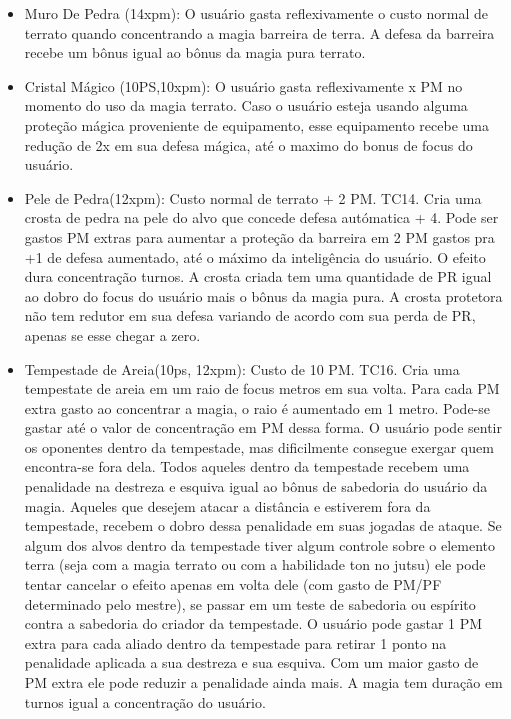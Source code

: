 \begin{itemize}
\item Muro De Pedra (14xpm): O usuário gasta reflexivamente o custo normal de terrato quando concentrando a magia barreira de terra. A defesa da barreira recebe um bônus igual ao bônus da magia pura terrato.

\item Cristal Mágico (10PS,10xpm): O usuário gasta reflexivamente x PM no momento do uso da magia terrato. Caso o usuário esteja usando alguma proteção mágica proveniente de equipamento, esse equipamento recebe uma redução de 2x em sua defesa mágica, até o maximo do bonus de focus do usuário. 

\item Pele de Pedra(12xpm): Custo normal de terrato + 2 PM. TC14.\newline
Cria uma crosta de pedra na pele do alvo que concede defesa autómatica + 4. Pode ser gastos PM extras para aumentar a proteção da barreira em 2 PM gastos pra +1 de defesa aumentado, até o máximo da inteligência do usuário. O efeito dura concentração turnos. A crosta criada tem uma quantidade de PR igual ao dobro do focus do usuário mais o bônus da magia pura. A crosta protetora não tem redutor em sua defesa variando de acordo com sua perda de PR, apenas se esse chegar a zero. 

\item Tempestade de Areia(10ps, 12xpm): Custo de 10 PM. TC16.\newline
Cria uma tempestate de areia em um raio de focus metros em sua volta. Para cada PM extra gasto ao concentrar a magia, o raio é aumentado em 1 metro. Pode-se gastar até o valor de concentração em PM dessa forma. O usuário pode sentir os oponentes dentro da tempestade, mas dificilmente consegue exergar quem encontra-se fora dela. Todos aqueles dentro da tempestade recebem uma penalidade na destreza e esquiva igual ao bônus de sabedoria do usuário da magia. Aqueles que desejem atacar a distância e estiverem fora da tempestade, recebem o dobro dessa penalidade em suas jogadas de ataque. Se algum dos alvos dentro da tempestade tiver algum controle sobre o elemento terra (seja com a magia terrato ou com a habilidade ton no jutsu) ele pode tentar cancelar o efeito apenas em volta dele (com gasto de PM/PF determinado pelo mestre), se passar em um teste de sabedoria ou espírito contra a sabedoria do criador da tempestade. O usuário pode gastar 1 PM extra para cada aliado  dentro da tempestade para retirar 1 ponto na penalidade aplicada a sua destreza e sua esquiva. Com um maior gasto de PM extra ele pode reduzir a penalidade ainda mais. A magia tem duração em turnos igual a concentração do usuário.


\end{itemize}

